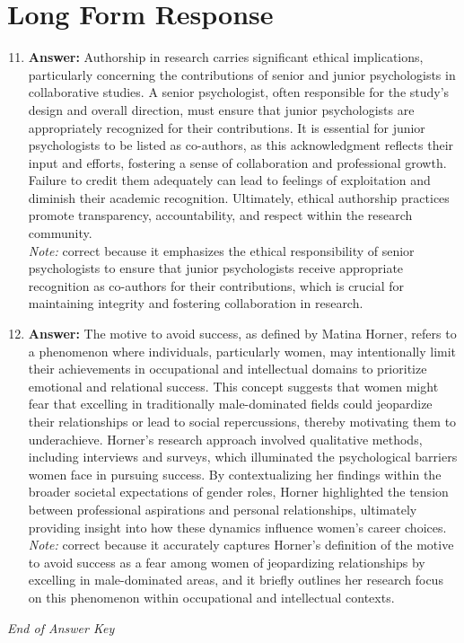 \documentclass[12pt]{article}
\begin{document}
\section*{Long Form Response}
\begin{enumerate}[label=\arabic*.]
\setcounter{enumi}{10}
\item \textbf{Answer:} Authorship in research carries significant ethical implications, particularly concerning the contributions of senior and junior psychologists in collaborative studies. A senior psychologist, often responsible for the study's design and overall direction, must ensure that junior psychologists are appropriately recognized for their contributions. It is essential for junior psychologists to be listed as co-authors, as this acknowledgment reflects their input and efforts, fostering a sense of collaboration and professional growth. Failure to credit them adequately can lead to feelings of exploitation and diminish their academic recognition. Ultimately, ethical authorship practices promote transparency, accountability, and respect within the research community.
\\ \textit{Note:} correct because it emphasizes the ethical responsibility of senior psychologists to ensure that junior psychologists receive appropriate recognition as co-authors for their contributions, which is crucial for maintaining integrity and fostering collaboration in research.
\item \textbf{Answer:} The motive to avoid success, as defined by Matina Horner, refers to a phenomenon where individuals, particularly women, may intentionally limit their achievements in occupational and intellectual domains to prioritize emotional and relational success. This concept suggests that women might fear that excelling in traditionally male-dominated fields could jeopardize their relationships or lead to social repercussions, thereby motivating them to underachieve. Horner's research approach involved qualitative methods, including interviews and surveys, which illuminated the psychological barriers women face in pursuing success. By contextualizing her findings within the broader societal expectations of gender roles, Horner highlighted the tension between professional aspirations and personal relationships, ultimately providing insight into how these dynamics influence women's career choices.
\\ \textit{Note:} correct because it accurately captures Horner's definition of the motive to avoid success as a fear among women of jeopardizing relationships by excelling in male-dominated areas, and it briefly outlines her research focus on this phenomenon within occupational and intellectual contexts.
\end{enumerate}

\vfill
\noindent\textit{End of Answer Key}
\end{document}

